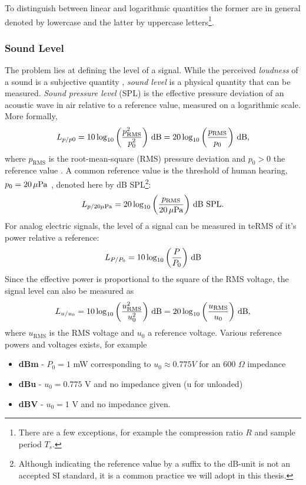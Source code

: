 \documentclass[../main2.tex]{subfiles}
\begin{document}
To distinguish between linear and logarithmic quantities the former are in general denoted by lowercase and the latter by uppercase letters\footnote{There are a few exceptions, for example the compression ratio $R$ and sample period $T_s$.}.
\subsubsection{Sound Level}
The problem lies at defining the level of a signal. While the perceived \emph{loudness} of a sound is a subjective quantity \cite{american1973american}, \emph{sound level} is a physical quantity that can be measured. \emph{Sound pressure level} (SPL) is the effective pressure deviation of an acoustic wave in air relative to a reference value, measured on a logarithmic scale. More formally,
\begin{equation}
L_{p/p0} = 10 \log_{10} \left( \frac{p_\text{RMS}^2}{p_0^2} \right) \mskip3mu\text{dB} = 20 \log_{10} \left( \frac{p_\text{RMS}}{p_0} \right) \mskip3mu\text{dB},
\end{equation}
where $p_\text{RMS}$ is the root-mean-square (RMS) pressure deviation and $p_0 > 0$ the reference value \cite{XXXXX}. A common reference value is the threshold of human hearing, $p_0 = 20 \mskip3mu\mu\text{Pa}$ \cite{XXXX}, denoted here by dB SPL\footnote{Although indicating the reference value by a suffix to the dB-unit is not an accepted SI standard, it is a common practice we will adopt in this thesis.}:
\begin{equation}
L_{p/20 \mu\text{Pa}} = 20 \log_{10} \left( \frac{p_\text{RMS}}{20 \mskip3mu\mu\text{Pa}} \right) \mskip3mu\text{dB SPL}.
\end{equation}
For analog electric signals, the level of a signal can be measured in teRMS of it's power relative a reference:
\begin{equation}
L_{P/P_0} = 10 \log_{10} \left( \frac{P}{P_0} \right) \mskip3mu\text{dB}
\end{equation}
Since the effective power is proportional to the square of the RMS voltage, the signal level can also be measured as
\begin{equation}
L_{u/u_0} = 10 \log_{10} \left( \frac{u_\text{RMS}^2}{u_0^2} \right) \mskip3mu\text{dB} = 20 \log_{10} \left( \frac{u_\text{RMS}}{u_0} \right) \mskip3mu\text{dB},
\end{equation}
where $u_\text{RMS}$ is the RMS voltage and $u_0$ a reference voltage. Various reference powers and voltages exists, for example 
\begin{itemize}
\item \textbf{dBm} - $P_0 = 1$ mW corresponding to $u_0 \approx 0.775 V$ for an 600 $\Omega$ impedance
\item \textbf{dBu} - $u_0 = 0.775$ V and no impedance given (u for unloaded)
\item \textbf{dBV} - $u_0 = 1$ V and no impedance given.
\end{itemize}
\end{document}
